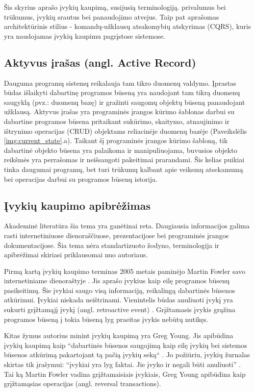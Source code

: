 Šis skyrius aprašo įvykių kaupimą, susijusią terminologiją. privalumus bei trūkumus, įvykių srautus bei panaudojimo atvejus. Taip pat aprašomas architektūrinis stilius - komandų-užklausų atsakomybių atskyrimas (CQRS), kuris yra naudojamas įvykių kaupimu pagrįstose sistemose. 

\subsection{Aktyvus įrašas (angl. Active Record)}

Dauguma programų sistemų reikalauja tam tikro duomenų valdymo. Įprastas būdas išlaikyti dabartinę programos būseną yra naudojant tam tikrą duomenų saugyklą (pvz.: duomenų bazę) ir gražinti saugomų objektų būseną panaudojant užklausą. Aktyvus įrašas yra programinės įrangos kūrimo šablonas darbui su dabartine programos būsena pritaikant sukūrimo, skaitymo, atnaujinimo ir ištrynimo operacijas (CRUD) objektams reliacinėje duomenų bazėje \cite{Fowler:2002:PEA:579257} (Paveikslėlis \ref{img:current_state}.a). Taikant šį programinės įrangos kūrimo šabloną, tik dabartinė objekto būsena yra palaikoma ir manipuliuojama, buvusios objekto reikšmės yra perrašomas ir neišsaugoti pakeitimai prarandami. Šis kelias puikiai tinka daugumai programų, bet turi trūkumų kalbant apie veiksmų atsekamumą bei operacijas darbui su programos būsenų istorija.

\subsection{Įvykių kaupimo apibrėžimas}

Akademinė literatūra šia tema yra ganėtinai reta. Daugiausia informacijos galima rasti internetiniuose dienoraščiuose, prezentacijose bei programinės įrangos dokumentacijose. Šia tema nėra standartizuoto žodyno, terminologija ir apibrėžimai skiriasi priklausomai nuo autoriaus.

Pirmą kartą įvykių kaupimo terminas 2005 metais paminėjo Martin Fowler savo internetiniame dienoraštyje \cite{Fowler:EventSourcing}. Jis aprašo įvykius kaip eilę programos būsenų pasikeitimų. Šie įvykiai saugo visą informaciją, reikalingą dabartinės būsenos atkūrimui. Įvykiai niekada neištrinami. Vienintelis būdas anuliuoti įvykį yra sukurti grįžtamąjį įvykį (angl. retroactive event) \cite{Fowler:RetroactiveEvent}. Grįžtamasis įvykis grąžina programos būseną į tokia būseną lyg praeitas įvykis nebūtų nutikęs.

Kitas žymus autorius minint įvykių kaupimą yra Greg Young. Jis apibūdina įvykių kaupimą kaip “dabartinės būsenos saugojimą kaip eilę įvykių bei sistemos būsenos atkūrimą pakartojant tą pačią įvykių seką“ \cite{Young:CQRS2010}. Jo požiūriu, įvykių žurnalas skirtas tik įrašymui: “įvykiai yra lyg faktai. Jie įvyko ir negali būti anuliuoti” \cite{Young:CQRS2013}. Tai ką Martin Fowler vadina grįžtamaisiais įvykiais, Greg Young apibūdina kaip grįžtamąsias operacijas (angl. reversal transactions).

